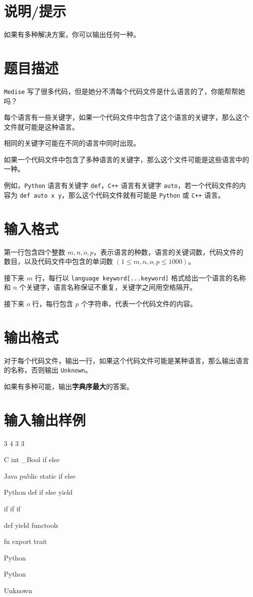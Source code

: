 \documentclass{../cpct/ctpro}
\begin{document}
\section*{说明/提示}

如果有多种解决方案，你可以输出任何一种。

\makeproblem
\section*{题目描述}

\texttt{Medise} 写了很多代码，但是她分不清每个代码文件是什么语言的了，你能帮帮她吗？

每个语言有一些关键字，如果一个代码文件中包含了这个语言的关键字，那么这个文件就可能是这种语言。

相同的关键字可能在不同的语言中同时出现。

如果一个代码文件中包含了多种语言的关键字，那么这个文件可能是这些语言中的一种。

例如，\texttt{Python} 语言有关键字 \texttt{def}，\texttt{C++} 语言有关键字 \texttt{auto}，若一个代码文件的内容为 \texttt{def auto x y}，那么这个代码文件就有可能是 \texttt{Python} 或 \texttt{C++} 语言。

\section*{输入格式}

第一行包含四个整数 $m,n,o,p$，表示语言的种数，语言的关键词数，代码文件的数目，以及代码文件中包含的单词数 $(1 \leq m,n,o,p \leq 1000)$。

接下来 $m$ 行，每行以 \texttt{language keyword[...keyword]} 格式给出一个语言的名称和 $n$ 个关键字，语言名称保证不重复，关键字之间用空格隔开。

接下来 $o$ 行，每行包含 $p$ 个字符串，代表一个代码文件的内容。

\section*{输出格式}

对于每个代码文件，输出一行，如果这个代码文件可能是某种语言，那么输出语言的名称，否则输出 \texttt{Unknown}。

如果有多种可能，输出\textbf{字典序最大}的答案。

\section*{输入输出样例}
\testcasetab
{
    3 4 3 3\par
    C int \_Bool if else\par
    Java public static if else\par
    Python def if else yield\par
    if if if\par
    def yield functools\par
    fn export trait
}
{
    Python\par
    Python\par
    Unknown
}
\end{document}
